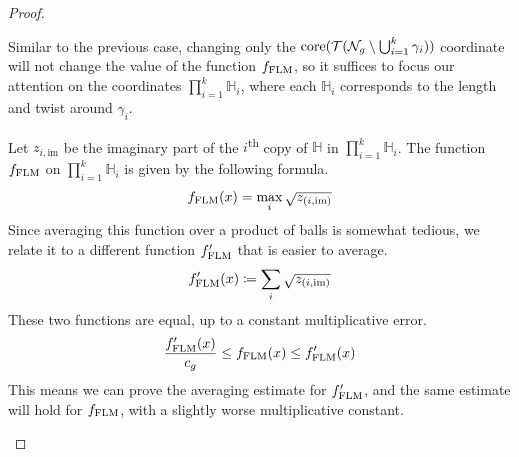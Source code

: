 \documentclass[12pt, reqno]{amsart}
\begin{document}
\begin{proof}
\begin{enumerate}[(i)]
    Similar to the previous case, changing only the $\mathrm{core}(\mathcal{T}(\mathcal{N}_g \setminus \bigcup_{i=1}^k \gamma_i))$ coordinate will not change the value of the function $f_{\mathrm{FLM}}$, so it suffices to focus our attention on the coordinates $\prod_{i=1}^k \mathbb{H}_i$, where each $\mathbb{H}_i$ corresponds to the length and twist around $\gamma_i$.

    Let $z_{i, \mathrm{im}}$ be the imaginary part of the $i$\textsuperscript{th} copy of $\mathbb{H}$ in $\prod_{i=1}^k \mathbb{H}_i$.
    The function $f_{\mathrm{FLM}}$ on $\prod_{i=1}^k \mathbb{H}_i$ is given by the following formula.
    \begin{align*}
      f_{\mathrm{FLM}}(x) = \max_{i} \sqrt{z_{(i, \mathrm{im})}}
    \end{align*}
    Since averaging this function over a product of balls is somewhat tedious, we relate it to a different function $f_{\mathrm{FLM}}^{\prime}$ that is easier to average.
    \begin{align*}
      f_{\mathrm{FLM}}^{\prime}(x) \coloneqq \sum_i \sqrt{z_{(i, \mathrm{im})}}
    \end{align*}
    These two functions are equal, up to a constant multiplicative error.
    \begin{align*}
      \frac{f_{\mathrm{FLM}}^{\prime}(x)}{c_g} \leq f_{\mathrm{FLM}}(x) \leq f_{\mathrm{FLM}}^{\prime}(x)
    \end{align*}
    This means we can prove the averaging estimate for $f_{\mathrm{FLM}}^{\prime}$, and the same estimate will hold for $f_{\mathrm{FLM}}$, with a slightly worse multiplicative constant.


\end{enumerate}
\end{proof}
\end{document}

